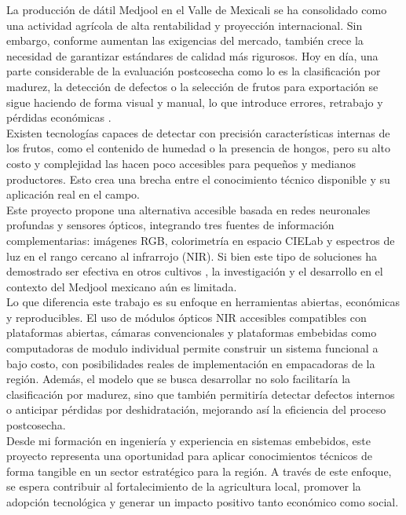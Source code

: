 La producción de dátil Medjool en el Valle de Mexicali se ha consolidado como una actividad agrícola de alta rentabilidad y proyección internacional. Sin embargo, conforme aumentan las exigencias del mercado, también crece la necesidad de garantizar estándares de calidad más rigurosos. Hoy en día, una parte considerable de la evaluación postcosecha como lo es la clasificación por madurez, la detección de defectos o la selección de frutos para exportación se sigue haciendo de forma visual y manual, lo que introduce errores, retrabajo y pérdidas económicas \parencite{perez-perez_evaluation_2021}.\\

Existen tecnologías capaces de detectar con precisión características internas de los frutos, como el contenido de humedad o la presencia de hongos, pero su alto costo y complejidad las hacen poco accesibles para pequeños y medianos productores. Esto crea una brecha entre el conocimiento técnico disponible y su aplicación real en el campo.\\

Este proyecto propone una alternativa accesible basada en redes neuronales profundas y sensores ópticos, integrando tres fuentes de información complementarias: imágenes RGB, colorimetría en espacio CIELab y espectros de luz en el rango cercano al infrarrojo (NIR). Si bien este tipo de soluciones ha demostrado ser efectiva en otros cultivos \parencite{chen_prediction_2024, wang_improving_2025}, la investigación y el desarrollo en el contexto del Medjool mexicano aún es limitada.\\

Lo que diferencia este trabajo es su enfoque en herramientas abiertas, económicas y reproducibles. El uso de módulos ópticos NIR accesibles compatibles con plataformas abiertas, cámaras convencionales y plataformas embebidas como computadoras de modulo individual permite construir un sistema funcional a bajo costo, con posibilidades reales de implementación en empacadoras de la región. Además, el modelo que se busca desarrollar no solo facilitaría la clasificación por madurez, sino que también permitiría detectar defectos internos o anticipar pérdidas por deshidratación, mejorando así la eficiencia del proceso postcosecha.\\

Desde mi formación en ingeniería y experiencia en sistemas embebidos, este proyecto representa una oportunidad para aplicar conocimientos técnicos de forma tangible en un sector estratégico para la región. A través de este enfoque, se espera contribuir al fortalecimiento de la agricultura local, promover la adopción tecnológica y generar un impacto positivo tanto económico como social.\\
